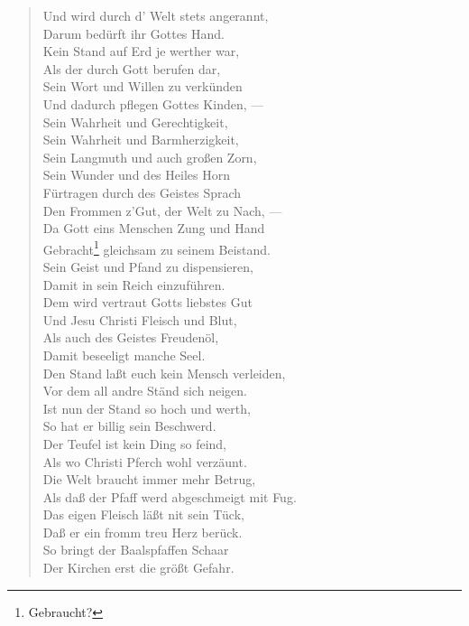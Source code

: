 \begin{verse}
Und wird durch d’ Welt stets angerannt,\\
Darum bedürft ihr Gottes Hand.\\
Kein Stand auf Erd je werther war,\\
Als der durch Gott berufen dar,\\
Sein Wort und Willen zu verkünden\\
Und dadurch pflegen Gottes Kinden, —\\
Sein Wahrheit und Gerechtigkeit,\\
Sein Wahrheit und Barmherzigkeit,\\
Sein Langmuth und auch großen Zorn,\\
Sein Wunder und des Heiles Horn\\
Fürtragen durch des Geistes Sprach\\
Den Frommen z’Gut, der Welt zu Nach, —\\
Da Gott eins Menschen Zung und Hand\\
Gebracht\footnote{Gebraucht?} gleichsam zu seinem Beistand.\\
Sein Geist und Pfand zu dispensieren,\\
Damit in sein Reich einzuführen.\\
Dem wird vertraut Gotts liebstes Gut\\
Und Jesu Christi Fleisch und Blut,\\
Als auch des Geistes Freudenöl,\\
Damit beseeligt manche Seel.\\
Den Stand laßt euch kein Mensch verleiden,\\
Vor dem all andre Ständ sich neigen.\\
Ist nun der Stand so hoch und werth,\\
So hat er billig sein Beschwerd.\\
Der Teufel ist kein Ding so feind,\\
Als wo Christi Pferch wohl verzäunt.\\
Die Welt braucht immer mehr Betrug,\\
Als daß der Pfaff werd abgeschmeigt mit Fug.\\
Das eigen Fleisch läßt nit sein Tück,\\
Daß er ein fromm treu Herz berück.\\
So bringt der Baalspfaffen Schaar\\
Der Kirchen erst die größt Gefahr.
\end{verse}

